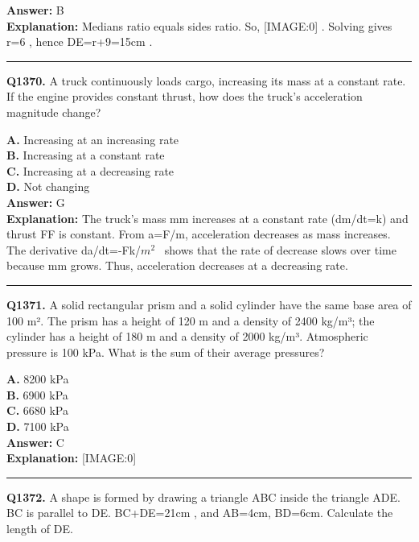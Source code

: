 \documentclass[12pt]{article}
\begin{document}
\textbf{Answer:} B \\
\textbf{Explanation:} Medians ratio equals sides ratio. So,
[IMAGE:0]
. Solving gives r=6
, hence DE=r+9=15cm
.

\hrule
\vspace{1em}


\noindent
\textbf{Q1370.} A truck continuously loads cargo, increasing its mass at a constant rate. If the engine provides constant thrust, how does the truck's acceleration magnitude change?



\textbf{A.} Increasing at an increasing rate \\
\textbf{B.} Increasing at a constant rate \\
\textbf{C.} Increasing at a decreasing rate \\
\textbf{D.} Not changing \\

\textbf{Answer:} G \\
\textbf{Explanation:} The truck's mass mm increases at a constant rate (dm/dt=k) and thrust FF is constant. From a=F/m, acceleration decreases as mass increases. The derivative da/dt=-Fk/$m^2$  shows that the rate of decrease slows over time because mm grows. Thus, acceleration decreases at a decreasing rate.

\hrule
\vspace{1em}


\noindent
\textbf{Q1371.} A solid rectangular prism and a solid cylinder have the same base area of 100 m². The prism has a height of 120 m and a density of 2400 kg/m³; the cylinder has a height of 180 m and a density of 2000 kg/m³. Atmospheric pressure is 100 kPa. What is the sum of their average pressures?



\textbf{A.} 8200 kPa \\
\textbf{B.} 6900 kPa \\
\textbf{C.} 6680 kPa \\
\textbf{D.} 7100 kPa \\

\textbf{Answer:} C \\
\textbf{Explanation:} [IMAGE:0]

\hrule
\vspace{1em}


\noindent
\textbf{Q1372.} A shape is formed by drawing a triangle ABC inside the triangle ADE. BC is parallel to DE. BC+DE=21cm
, and AB=4cm, BD=6cm.
Calculate the length of DE.
\end{document}
